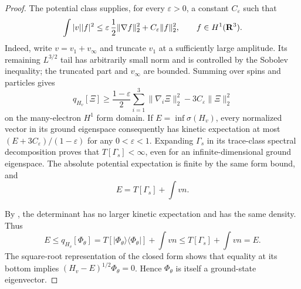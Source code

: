 \begin{proof}
The potential class supplies, for every $\varepsilon>0$, a constant
$C_\varepsilon$ such that
\begin{equation}
 \int|v||f|^2
 \le\varepsilon\,\frac12\|\nabla f\|_2^2
      +C_\varepsilon\|f\|_2^2,
 \qquad f\in H^1(\mathbf R^3).
 \label{eq:ensemble-standard-form-bound}
\end{equation}
Indeed, write $v=v_1+v_\infty$ and truncate $v_1$ at a sufficiently
large amplitude.  Its remaining $L^{3/2}$ tail has arbitrarily small
norm and is controlled by the Sobolev inequality; the truncated part
and $v_\infty$ are bounded.  Summing
 over spins and particles gives
\[
 q_{H_v}[\Xi]
 \ge\frac{1-\varepsilon}{2}\sum_{i=1}^3\|\nabla_i\Xi\|_2^2
       -3C_\varepsilon\|\Xi\|_2^2
\]
on the many-electron $H^1$ form domain.  If $E=\inf\sigma(H_v)$, every
normalized vector in its ground eigenspace consequently has kinetic
expectation at most $(E+3C_\varepsilon)/(1-\varepsilon)$ for any
$0<\varepsilon<1$.  Expanding $\Gamma_s$ in its trace-class spectral
decomposition proves that $T[\Gamma_s]<\infty$, even for an
infinite-dimensional ground eigenspace.  The absolute potential
expectation is finite by the same form bound, and
\[
 E=T[\Gamma_s]+\int vn.
\]

By , the determinant has no larger
kinetic expectation and has the same density.  Thus
\[
 E\le q_{H_v}[\Phi_\theta]
 =T[|\Phi_\theta\rangle\langle\Phi_\theta|]+\int vn
 \le T[\Gamma_s]+\int vn=E.
\]
The square-root representation of the closed form
\cite[Chapter~VI, Theorem~2.23]{Kato} shows that equality at its bottom implies
$(H_v-E)^{1/2}\Phi_\theta=0$.  Hence $\Phi_\theta$ is itself a
ground-state eigenvector.


\end{proof}
